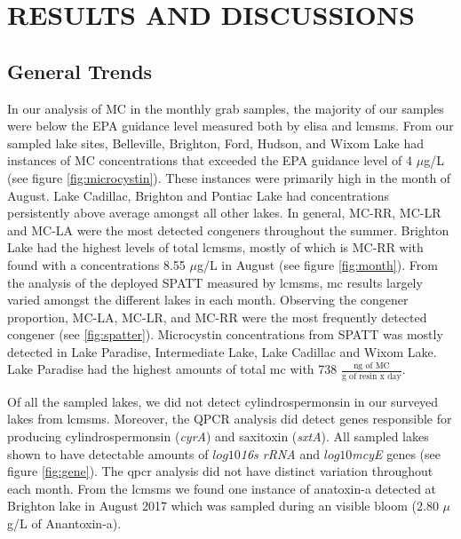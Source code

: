 \chapter{RESULTS AND DISCUSSIONS}
\section{General Trends}

In our analysis of MC in the monthly grab samples, the majority of our samples were below the EPA guidance level measured both by \gls{elisa} and \gls{lcmsms}. From our sampled lake sites, Belleville, Brighton, Ford, Hudson, and Wixom Lake had instances of MC concentrations that exceeded the EPA guidance level of 4 $\mu$g/L  (see figure \ref{fig:microcystin}). These instances were primarily high in the month of August. Lake Cadillac, Brighton and Pontiac Lake had concentrations persistently above average amongst all other lakes. In general, MC-RR, MC-LR and MC-LA were the most detected congeners throughout the summer. Brighton Lake had the highest levels of total \gls{lcmsms}, mostly of which is MC-RR with found with a concentrations 8.55 $\mu$g/L in August (see figure \ref{fig:month}). From the analysis of the deployed SPATT measured by \gls{lcmsms}, \gls{mc} results largely varied amongst the different lakes in each month. Observing the congener proportion, MC-LA, MC-LR, and MC-RR were the most frequently detected congener (see \ref{fig:spatter}). Microcystin concentrations from SPATT was mostly detected in Lake Paradise, Intermediate Lake, Lake Cadillac and Wixom Lake. Lake Paradise had the highest amounts of total \gls{mc} with 738 $\frac{\text{ng of MC}}{\text{g of resin x day}}$.  

Of all the sampled lakes, we did not detect cylindrospermonsin in our surveyed lakes from \gls{lcmsms}. Moreover, the QPCR analysis did detect genes responsible for producing cylindrospermonsin (\emph{cyrA}) and saxitoxin (\emph{sxtA}). All sampled lakes shown to have detectable amounts of $log10$\emph{16s rRNA} and $log10$\emph{mcyE} genes (see figure \ref{fig:gene}). The \gls{qpcr} analysis did not have distinct variation throughout each month.  From the \gls{lcmsms} we found one instance of anatoxin-a detected at Brighton lake in August 2017 which was sampled during an visible bloom (2.80 $\mu$g/L of Anantoxin-a). %


